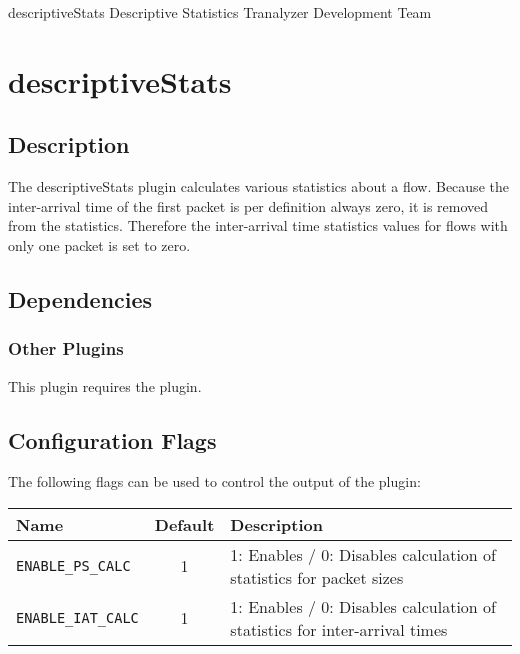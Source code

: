 \documentclass[documentation]{subfiles}
\begin{document}
\trantitle
    {descriptiveStats}
    {Descriptive Statistics}
    {Tranalyzer Development Team} %

\section{descriptiveStats}\label{s:descriptiveStats}

\subsection{Description}
The descriptiveStats plugin calculates various statistics about a flow.
Because the inter-arrival time of the first packet is per definition always zero, it is removed from the statistics.
Therefore the inter-arrival time statistics values for flows with only one packet is set to zero.

\subsection{Dependencies}




\subsubsection{Other Plugins}
This plugin requires the  plugin.


\subsection{Configuration Flags}
The following flags can be used to control the output of the plugin:
\begin{longtable}{lcl}
    \toprule
    {\bf Name} & {\bf Default} & {\bf Description} \\
    \midrule\endhead%
    {\tt ENABLE\_PS\_CALC}  & 1 & 1: Enables / 0: Disables calculation of statistics for packet sizes\\
    {\tt ENABLE\_IAT\_CALC} & 1 & 1: Enables / 0: Disables calculation of statistics for inter-arrival times\\
    \bottomrule
\end{longtable}
\end{document}
